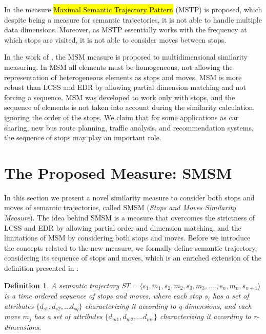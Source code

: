\documentclass[12pt]{article}
\newtheorem{definition}{Definition}
\begin{document}
In \cite{Ying:2010:MUS:1867699.1867703} the measure \hl{Maximal Semantic Trajectory Pattern} (MSTP) is proposed, which despite being a measure for semantic trajectories, it is not able to handle multiple data dimensions. Moreover, as MSTP essentially works with the frequency at which stops are visited, it is not able to consider moves between stops.

In the work of \cite{Furtado:TGIS12156}, the MSM measure is proposed to multidimensional similarity measuring. In MSM all elements must be homogeneous, not allowing the representation of heterogeneous elements as stops and moves. MSM is more robust than LCSS and EDR by allowing partial dimension matching and not forcing a sequence. MSM was developed to work only with stops, and the sequence of elements is not taken into account during the similarity calculation, ignoring the order of the stops. We claim that for some applications as car sharing, new bus route planning, traffic analysis, and recommendation systems, the sequence of stops may play an important role.



\section{The Proposed Measure: SMSM} \label{sec:proposed_measure}
In this section we present a novel similarity measure to consider both stops and moves of semantic trajectories, called SMSM (\textit{Stops and Moves Similarity Measure}). The idea behind SMSM is a measure that overcomes the strictness of LCSS and EDR by allowing partial order and dimension matching, and the limitations of MSM by considering both stops and moves. Before we introduce the concepts related to the new measure, we formally define semantic trajectory, considering its sequence of stops and moves, which is an enriched extension of the definition presented in \cite{Spaccapietra:2008:CVT:1347466.1347785}:


\begin{definition}
\label{def:semantic_trajectory}
A semantic trajectory  $ST=\langle s_1, m_1, s_2, m_2, s_3,m_3, ...., s_n, m_n, s_{n+1} \rangle$ is a time ordered sequence of stops and moves, where each stop $s_i$ has a set of attributes $\{d_{s1}, d_{s2}, ...d_{sq}\}$ characterizing it according to q-dimensions, and each move $m_j$  has a set of attributes $\{d_{m1}, d_{m2}, ...d_{mr}\}$  characterizing it according to r-dimensions. 
\end{definition}
\end{document}
